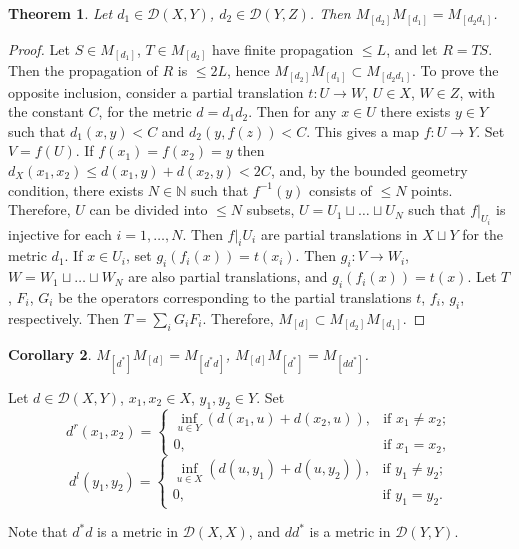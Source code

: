 \documentclass[12pt]{amsart}
\newtheorem{thm}{Theorem}[section]
\newtheorem{cor}[thm]{Corollary}
\theoremstyle{definition}
\begin{document}
\begin{thm}
Let $d_1\in\mathcal D(X,Y)$, $d_2\in\mathcal D(Y,Z)$. Then $M_{[d_2]}M_{[d_1]}=M_{[d_2d_1]}$.

\end{thm}     
\begin{proof}
Let $S\in M_{[d_1]}$, $T\in M_{{[d_2]}}$ have finite propagation $\leq L$, and let $R=TS$. Then the propagation of $R$ is $\leq 2L$, hence $M_{[d_2]}M_{[d_1]}\subset M_{[d_2d_1]}$. 
To prove the opposite inclusion, consider a partial translation $t:U\to W$, $U\in X$, $W\in Z$, with the constant $C$, for the metric $d=d_1d_2$. Then for any $x\in U$ there exists $y\in Y$ such that $d_1(x,y)<C$ and $d_2(y,f(z))<C$. This gives a map $f:U\to Y$. Set $V=f(U)$. If $f(x_1)=f(x_2)=y$ then $d_X(x_1,x_2)\leq d(x_1,y)+d(x_2,y)<2C$, and, by the bounded geometry condition, there exists $N\in\mathbb N$ such that $f^{-1}(y)$ consists of $\leq N$ points. Therefore, $U$ can be divided into $\leq N$ subsets, $U=U_1\sqcup\ldots\sqcup U_N$ such that $f|_{U_i}$ is injective for each $i=1,\ldots,N$. Then $f|_i{U_i}$ are partial translations in $X\sqcup Y$ for the metric $d_1$. If $x\in U_i$, set $g_i(f_i(x))=t(x_i)$. Then $g_i:V\to W_i$, $W=W_1\sqcup\ldots\sqcup W_N$ are also partial translations, and $g_i(f_i(x))=t(x)$.
Let $T$, $F_i$, $G_i$ be the operators corresponding to the partial translations $t$, $f_i$, $g_i$, respectively. Then $T=\sum_i G_iF_i$. Therefore, $M_{[d]}\subset M_{[d_2]}M_{[d_1]}$.  
\end{proof}

\begin{cor}
$M_{[d^*]}M_{[d]}=M_{[d^*d]}$, $M_{[d]}M_{[d^*]}=M_{[dd^*]}$.

\end{cor}

Let $d\in\mathcal D(X,Y)$, $x_1,x_2\in X$, $y_1,y_2\in Y$. Set
$$
d^r(x_1,x_2)=\left\lbrace\begin{array}{cl}\inf_{u\in Y}(d(x_1,u)+d(x_2,u)),&\mbox{if\ }x_1\neq x_2;\\0,&\mbox{if\ } x_1=x_2,\end{array}\right. 
$$
$$
d^l(y_1,y_2)=\left\lbrace\begin{array}{cl}\inf_{u\in X}(d(u,y_1)+d(u,y_2)),&\mbox{if\ }y_1\neq y_2;\\0,&\mbox{if\ } y_1=y_2.\end{array}\right.
$$

Note that $d^*d$ is a metric in $\mathcal D(X,X)$, and $dd^*$ is a metric in $\mathcal D(Y,Y)$.
\end{document}

